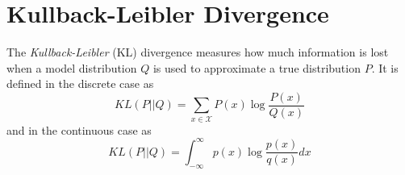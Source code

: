 \section{Kullback-Leibler Divergence}

The \emph{Kullback-Leibler} (KL) divergence
measures how much information is lost when a
model distribution $Q$ is used to approximate
a true distribution $P$. It
is defined in the discrete case as
\begin{equation}
    KL(P||Q) = \sum_{x\in \mathcal{X}} P(x)\log \frac{P(x)}{Q(x)}
\end{equation}
and in the continuous case as
\begin{equation}
    KL(P||Q) = \int_{-\infty}^{\infty} p(x) \log \frac{p(x)}{q(x)} dx
\end{equation}